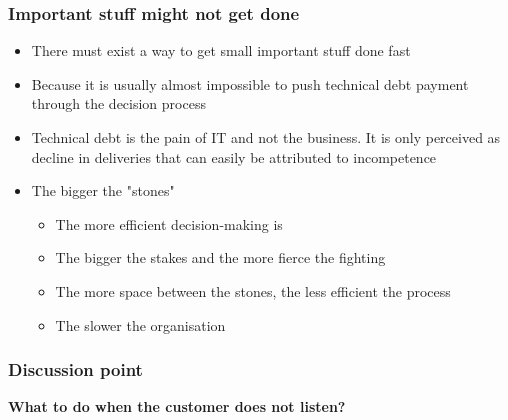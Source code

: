 \begin{frame}[fragile]
  \frametitle{Important stuff might not get done}
		\begin{itemize}
			\item There must exist a way to get small important stuff done fast 
			\item Because it is usually almost impossible to push technical debt payment through the decision process
			\item Technical debt is the pain of IT and not the business. It is only perceived as decline in deliveries that can easily be attributed to incompetence
			\item The bigger the "stones"
			\begin{itemize}
				\item The more efficient decision-making is
				\item The bigger the stakes and the more fierce the fighting
				\item The more space between the stones, the less efficient the process
				\item The slower the organisation
			\end{itemize}
		\end{itemize}
\end{frame}


\begin{frame}[fragile]
  \frametitle{Discussion point}
		\begin{center}
			\textbf{What to do when the customer does not listen?}
		\end{center}
\end{frame}



\begin{frame}[t,allowframebreaks,]
  	
	 

\end{frame}

